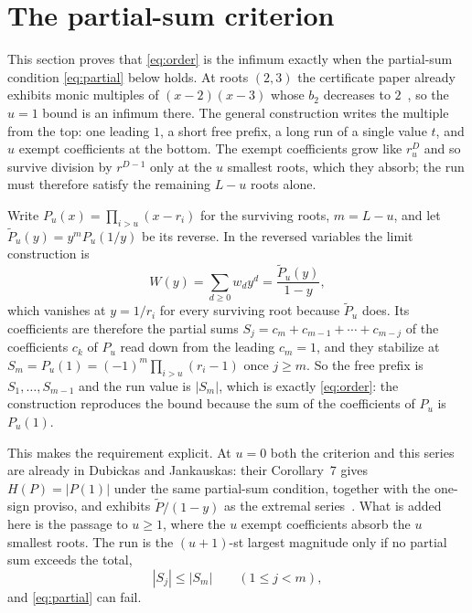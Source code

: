 \documentclass[11pt]{article}
\theoremstyle{definition}
\theoremstyle{plain}
\begin{document}
\section{The partial-sum criterion}\label{sec:criterion}

This section proves that \eqref{eq:order} is the infimum exactly when the
partial-sum condition \eqref{eq:partial} below holds.  At roots $(2,3)$ the
certificate paper already exhibits monic multiples of $(x-2)(x-3)$ whose
$b_2$ decreases to $2$~\cite[Proposition~4.4]{coefficient-mass}, so the $u=1$
bound is an infimum there.  The general construction writes the multiple
from the top: one leading $1$, a short free prefix, a long run of a single
value $t$, and $u$ exempt coefficients at the bottom.  The exempt
coefficients grow like $r_u^D$ and so survive division by $r^{D-1}$ only at
the $u$ smallest roots, which they absorb; the run must therefore satisfy the
remaining $L-u$ roots alone.

Write $P_u(x)=\prod_{i>u}(x-r_i)$ for the
surviving roots, $m=L-u$, and let $\widetilde P_u(y)=y^mP_u(1/y)$ be its
reverse.  In the reversed variables the limit construction is
\begin{equation}\label{eq:wgen}
  W(y)=\sum_{d\ge0}w_dy^d=\frac{\widetilde P_u(y)}{1-y},
\end{equation}
which vanishes at $y=1/r_i$ for every surviving root because
$\widetilde P_u$ does.  Its coefficients are therefore the partial sums
$S_j=c_m+c_{m-1}+\cdots+c_{m-j}$ of the coefficients $c_k$ of $P_u$ read down
from the leading $c_m=1$, and they stabilize at
$S_m=P_u(1)=(-1)^m\prod_{i>u}(r_i-1)$ once $j\ge m$.  So the free prefix is
$S_1,\ldots,S_{m-1}$ and the run value is $|S_m|$, which is exactly
\eqref{eq:order}: the construction reproduces the bound because the sum of the
coefficients of $P_u$ is $P_u(1)$.

This makes the requirement explicit.  At $u=0$ both the criterion and this
series are already in Dubickas and Jankauskas: their Corollary~7 gives
$H(P)=|P(1)|$ under the same partial-sum condition, together with the one-sign
proviso, and exhibits $\widetilde P/(1-y)$ as the extremal
series~\cite[Corollary~7]{dj}.  What is added here is the passage to $u\ge1$,
where the $u$ exempt coefficients absorb the $u$ smallest roots.  The run is
the $(u+1)$-st largest magnitude only if no partial sum exceeds the total,
\begin{equation}\label{eq:partial}
  |S_j|\le|S_m|\qquad(1\le j<m),
\end{equation}
and \eqref{eq:partial} can fail.
\end{document}
